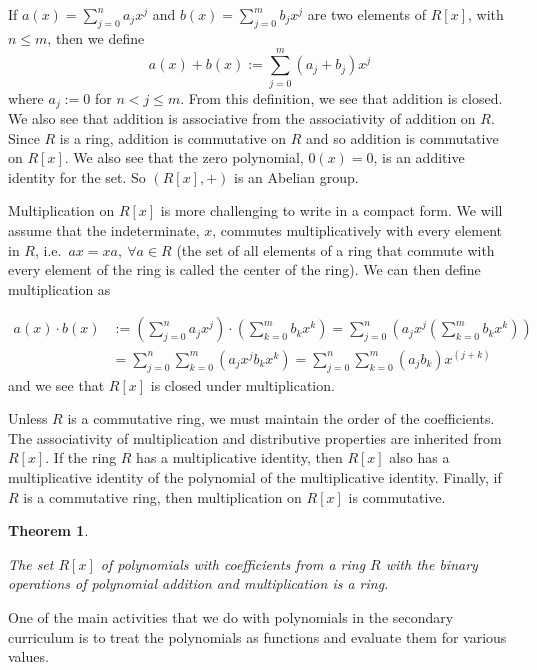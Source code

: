 \documentclass[
]{book}
\newtheorem{theorem}{Theorem}[chapter]
\theoremstyle{definition}
\theoremstyle{definition}
\theoremstyle{definition}
\theoremstyle{definition}
\theoremstyle{remark}
\begin{document}
If \(a(x)=\sum_{j=0}^n a_j x^j\) and \(b(x)=\sum_{j=0}^m b_j x^j\) are two elements of \(R[x]\), with \(n\leq m\), then we define
\[a(x)+b(x) := \sum_{j=0}^m (a_j+b_j) x^j\] where \(a_j:=0\) for \(n<j\leq m\). From this definition, we see that addition is closed. We also see that addition is associative from the associativity of addition on \(R\). Since \(R\) is a ring, addition is commutative on \(R\) and so addition is commutative on \(R[x]\). We also see that the zero polynomial, \(0(x)=0\), is an additive identity for the set. So \((R[x],+)\) is an Abelian group.

Multiplication on \(R[x]\) is more challenging to write in a compact form. We will assume that the indeterminate, \(x\), commutes multiplicatively with every element in \(R\), i.e.~\(ax=xa, \: \forall a\in R\) (the set of all elements of a ring that commute with every element of the ring is called the center of the ring). We can then define multiplication as

\begin{align*}
    a(x) \cdot b(x) &:= \left( \sum_{j=0}^n a_j x^j \right) \cdot \left(\sum_{k=0}^m b_k x^k\right) 
    = \sum_{j=0}^n \left( a_j x^j \left(\sum_{k=0}^m b_k x^k\right) \right) \\
    &= \sum_{j=0}^n \sum_{k=0}^m \left(a_j x^j b_k x^k\right) 
    = \sum_{j=0}^n \sum_{k=0}^m \left(a_j b_k\right) x^{(j+k)}
\end{align*}
and we see that \(R[x]\) is closed under multiplication.

Unless \(R\) is a commutative ring, we must maintain the order of the coefficients. The associativity of multiplication and distributive properties are inherited from \(R[x]\). If the ring \(R\) has a multiplicative identity, then \(R[x]\) also has a multiplicative identity of the polynomial of the multiplicative identity. Finally, if \(R\) is a commutative ring, then multiplication on \(R[x]\) is commutative.

\begin{theorem}
\protect\hypertarget{thm:unlabeled-div-113}{}\label{thm:unlabeled-div-113}

The set \(R[x]\) of polynomials with coefficients from a ring \(R\) with the binary operations of polynomial addition and multiplication is a ring.

\end{theorem}

One of the main activities that we do with polynomials in the secondary curriculum is to treat the polynomials as functions and evaluate them for various values.
\end{document}

